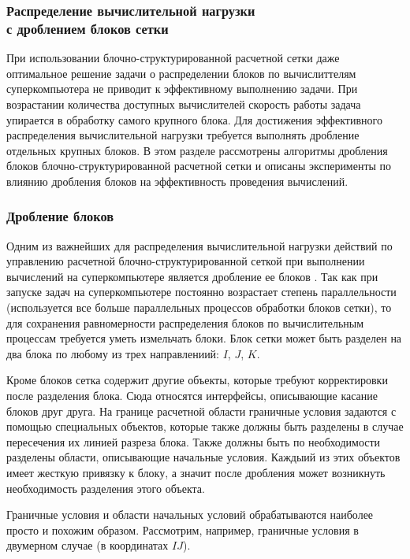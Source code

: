 \subsubsection{Распределение вычислительной нагрузки \\ с дроблением блоков сетки}

При использовании блочно-структурированной расчетной сетки\label{term:mesh_block_struct3} даже оптимальное решение задачи о распределении блоков по вычислиттелям суперкомпьютера не приводит к эффективному выполнению задачи.
При возрастании количества доступных вычислителей скорость работы задача упирается в обработку самого крупного блока.
Для достижения эффективного распределения вычислительной нагрузки требуется выполнять дробление отдельных крупных блоков.
В этом разделе рассмотрены алгоритмы дробления блоков блочно-структурированной расчетной сетки и описаны эксперименты по влиянию дробления блоков на эффективность проведения вычислений.

\subsubsection{Дробление блоков}

Одним из важнейших для распределения вычислительной нагрузки действий по управлению расчетной блочно-структурированной сеткой при выполнении вычислений на суперкомпьютере является дробление ее блоков \cite{Rybakov2016WithCut}.
Так как при запуске задач на суперкомпьютере постоянно возрастает степень параллельности (используется все больше параллельных процессов обработки блоков сетки), то для сохранения равномерности распределения блоков по вычислительным процессам требуется уметь измельчать блоки.
Блок сетки может быть разделен на два блока по любому из трех направлениий: $I$, $J$, $K$.

Кроме блоков сетка содержит другие объекты, которые требуют корректировки после разделения блока.
Сюда относятся интерфейсы, описывающие касание блоков друг друга.
На границе расчетной области граничные условия задаются с помощью специальных объектов, которые также должны быть разделены в случае пересечения их линией разреза блока.
Также должны быть по необходимости разделены области, описывающие начальные условия.
Каждыий из этих объектов имеет жесткую привязку к блоку, а значит после дробления может возникнуть
необходимость разделения этого объекта.

Граничные условия и области начальных условий обрабатываются наиболее просто и похожим образом.
Рассмотрим, например, граничные условия в двумерном случае (в координатах $IJ$).

